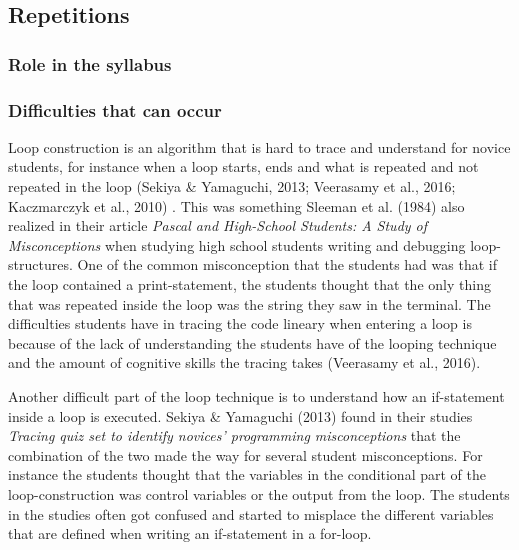 \subsection{Repetitions}

\subsubsection{Role in the syllabus}

\subsubsection{Difficulties that can occur}

Loop construction is an algorithm that is hard to trace and understand for novice students, for instance when a loop starts, ends and what is repeated and not repeated in the loop (Sekiya \& Yamaguchi, 2013; Veerasamy et al., 2016; Kaczmarczyk et al., 2010) . This was something Sleeman et al. (1984) also realized in their article \emph{Pascal and High-School Students: A Study of Misconceptions} when studying high school students writing and debugging loop-structures. One of the common misconception that the students had was that if the loop contained a print-statement, the students thought that the only thing that was repeated inside the loop was the string they saw in the terminal. The difficulties students have in tracing the code lineary when entering a loop is because of the lack of understanding the students have of the looping technique and the amount of cognitive skills the tracing takes (Veerasamy et al., 2016). 

Another difficult part of the loop technique is to understand how an if-statement inside a loop is executed. Sekiya \& Yamaguchi (2013) found in their studies \emph{Tracing quiz set to identify novices' programming misconceptions} that the combination of the two made the way for several student misconceptions. For instance the students thought that the variables in the conditional part of the loop-construction was control variables or the output from the loop. The students in the studies often got confused and started to misplace the different variables that are defined when writing an if-statement in a for-loop.

